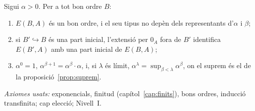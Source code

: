 \begin{teorema}\label{teo:exponenciacio-recursio}
Sigui \(\alpha>0\). Per a tot bon ordre \(B\):
\begin{enumerate}
\item \(E(B,A)\) és un bon ordre, i el seu tipus no depèn dels representants
d'\(\alpha\) i \(\beta\);
\item si \(B'\hookrightarrow B\) és una part inicial, l'extensió per \(0_A\)
fora de \(B'\) identifica \(E(B',A)\) amb una part inicial de \(E(B,A)\);
\item \(\alpha^{0}=1\), \(\alpha^{\beta+1}=\alpha^{\beta}\cdot\alpha\), i, si
\(\lambda\) és límit, \(\alpha^{\lambda}=\sup_{\beta<\lambda}\alpha^{\beta}\),
on el suprem és el de la proposició~\ref{prop:suprem}.
\end{enumerate}
\emph{Axiomes usats:} exponencials, finitud (capítol~\ref{cap:finits}),
bons ordres, inducció transfinita; cap elecció; Nivell~I.
\end{teorema}

